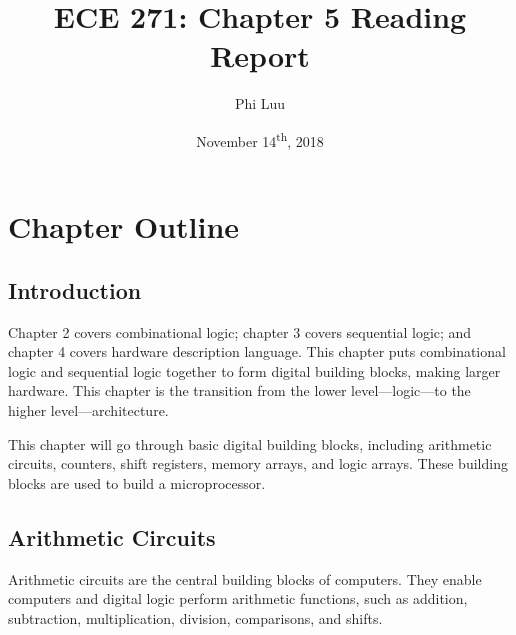 \documentclass[12pt]{article}
\title{ECE 271: Chapter 5 Reading Report}
\author{Phi Luu}
\date{November 14\textsuperscript{th}, 2018}
\numberwithin{figure}{subsection}
\numberwithin{table}{subsection}
\numberwithin{equation}{subsection}
\begin{document}
\maketitle

\section{Chapter Outline}

\subsection{Introduction}

Chapter 2 covers combinational logic; chapter 3 covers sequential logic; and chapter 4 covers hardware description language. This chapter puts combinational logic and sequential logic together to form digital building blocks, making larger hardware. This chapter is the transition from the lower level---logic---to the higher level---architecture.

This chapter will go through basic digital building blocks, including arithmetic circuits, counters, shift registers, memory arrays, and logic arrays. These building blocks are used to build a microprocessor.

\subsection{Arithmetic Circuits}

Arithmetic circuits are the central building blocks of computers. They enable computers and digital logic perform arithmetic functions, such as addition, subtraction, multiplication, division, comparisons, and shifts.
\end{document}
